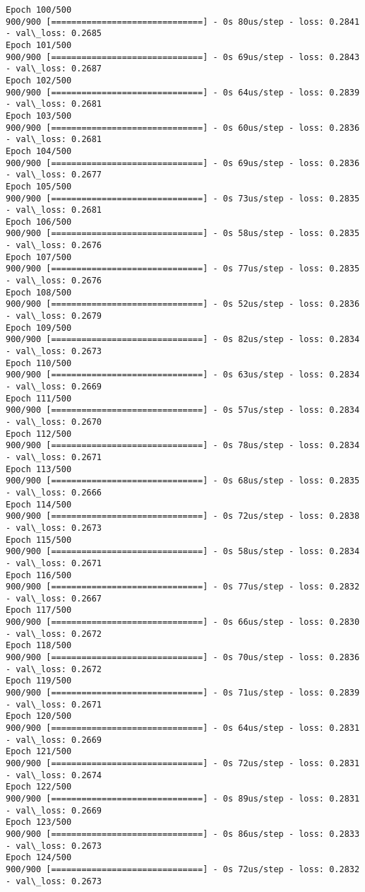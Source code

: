 \documentclass[11pt]{article}
\begin{document}
\begin{Verbatim}[commandchars=\\\{\}]
Epoch 100/500
900/900 [==============================] - 0s 80us/step - loss: 0.2841 - val\_loss: 0.2685
Epoch 101/500
900/900 [==============================] - 0s 69us/step - loss: 0.2843 - val\_loss: 0.2687
Epoch 102/500
900/900 [==============================] - 0s 64us/step - loss: 0.2839 - val\_loss: 0.2681
Epoch 103/500
900/900 [==============================] - 0s 60us/step - loss: 0.2836 - val\_loss: 0.2681
Epoch 104/500
900/900 [==============================] - 0s 69us/step - loss: 0.2836 - val\_loss: 0.2677
Epoch 105/500
900/900 [==============================] - 0s 73us/step - loss: 0.2835 - val\_loss: 0.2681
Epoch 106/500
900/900 [==============================] - 0s 58us/step - loss: 0.2835 - val\_loss: 0.2676
Epoch 107/500
900/900 [==============================] - 0s 77us/step - loss: 0.2835 - val\_loss: 0.2676
Epoch 108/500
900/900 [==============================] - 0s 52us/step - loss: 0.2836 - val\_loss: 0.2679
Epoch 109/500
900/900 [==============================] - 0s 82us/step - loss: 0.2834 - val\_loss: 0.2673
Epoch 110/500
900/900 [==============================] - 0s 63us/step - loss: 0.2834 - val\_loss: 0.2669
Epoch 111/500
900/900 [==============================] - 0s 57us/step - loss: 0.2834 - val\_loss: 0.2670
Epoch 112/500
900/900 [==============================] - 0s 78us/step - loss: 0.2834 - val\_loss: 0.2671
Epoch 113/500
900/900 [==============================] - 0s 68us/step - loss: 0.2835 - val\_loss: 0.2666
Epoch 114/500
900/900 [==============================] - 0s 72us/step - loss: 0.2838 - val\_loss: 0.2673
Epoch 115/500
900/900 [==============================] - 0s 58us/step - loss: 0.2834 - val\_loss: 0.2671
Epoch 116/500
900/900 [==============================] - 0s 77us/step - loss: 0.2832 - val\_loss: 0.2667
Epoch 117/500
900/900 [==============================] - 0s 66us/step - loss: 0.2830 - val\_loss: 0.2672
Epoch 118/500
900/900 [==============================] - 0s 70us/step - loss: 0.2836 - val\_loss: 0.2672
Epoch 119/500
900/900 [==============================] - 0s 71us/step - loss: 0.2839 - val\_loss: 0.2671
Epoch 120/500
900/900 [==============================] - 0s 64us/step - loss: 0.2831 - val\_loss: 0.2669
Epoch 121/500
900/900 [==============================] - 0s 72us/step - loss: 0.2831 - val\_loss: 0.2674
Epoch 122/500
900/900 [==============================] - 0s 89us/step - loss: 0.2831 - val\_loss: 0.2669
Epoch 123/500
900/900 [==============================] - 0s 86us/step - loss: 0.2833 - val\_loss: 0.2673
Epoch 124/500
900/900 [==============================] - 0s 72us/step - loss: 0.2832 - val\_loss: 0.2673

\end{Verbatim}
\end{document}
